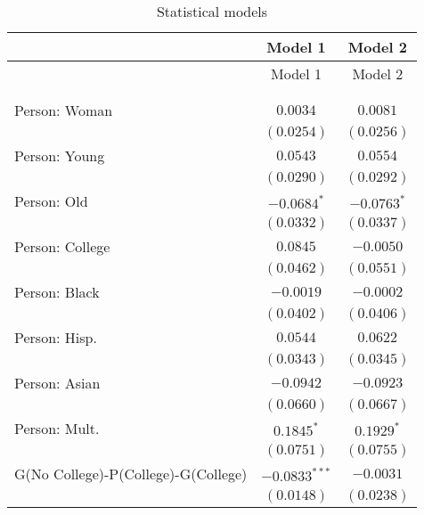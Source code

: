
\begin{center}
\begin{longtable}{l c c}
\toprule
 & Model 1 & Model 2 \\
\midrule
\endfirsthead
\toprule
 & Model 1 & Model 2 \\
\midrule
\endhead
\bottomrule
\endfoot
\bottomrule
\multicolumn{3}{l}{\scriptsize{$^{***}p<0.001$; $^{**}p<0.01$; $^{*}p<0.05$}}\\
\caption{Statistical models}
\label{table:coefficients}
\endlastfoot \\
Person: Woman                       & $0.0034$        & $0.0081$        \\
                                    & $(0.0254)$      & $(0.0256)$      \\
Person: Young                       & $0.0543$        & $0.0554$        \\
                                    & $(0.0290)$      & $(0.0292)$      \\
Person: Old                         & $-0.0684^{*}$   & $-0.0763^{*}$   \\
                                    & $(0.0332)$      & $(0.0337)$      \\
Person: College                     & $0.0845$        & $-0.0050$       \\
                                    & $(0.0462)$      & $(0.0551)$      \\
Person: Black                       & $-0.0019$       & $-0.0002$       \\
                                    & $(0.0402)$      & $(0.0406)$      \\
Person: Hisp.                       & $0.0544$        & $0.0622$        \\
                                    & $(0.0343)$      & $(0.0345)$      \\
Person: Asian                       & $-0.0942$       & $-0.0923$       \\
                                    & $(0.0660)$      & $(0.0667)$      \\
Person: Mult.                       & $0.1845^{*}$    & $0.1929^{*}$    \\
                                    & $(0.0751)$      & $(0.0755)$      \\
G(No College)-P(College)-G(College) & $-0.0833^{***}$ & $-0.0031$       \\
                                    & $(0.0148)$      & $(0.0238)$      \\

\end{longtable}
\end{center}
